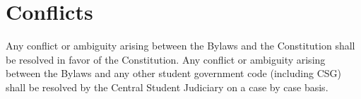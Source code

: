 \section{Conflicts} 
\begin{enumsubsection}
\itemnotoc Any conflict or ambiguity arising between the Bylaws and the 
Constitution shall be resolved in favor of the Constitution. 
\itemnotoc Any conflict or ambiguity arising between the Bylaws and any other 
student government code (including CSG) shall be resolved by the Central 
Student Judiciary on a case by case basis. 
\end{enumsubsection}